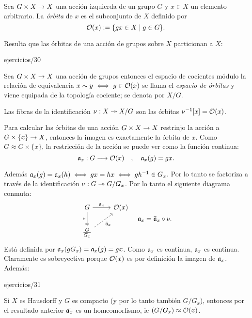 \documentclass[../../topologia_algebraica]{subfiles}
\begin{document}
\begin{defin}
  Sea $G\times X\rightarrow X$ una acci\'on izquierda de un grupo $G$ y $x\in X$ un elemento arbitrario.
  La \emph{\'orbita} de $x$ es el subconjunto de $X$ definido por
  \[
    \mathcal{O}(x):=\{gx\in X\mid g\in G\}.
  \]
\end{defin}

Resulta que las \'orbitas de una acci\'on de grupos sobre $X$ particionan a $X$:

{ejercicios/30} %

\begin{defin}
  Sea $G\times X\rightarrow X$ una acci\'on de grupos entonces el espacio de cocientes m\'odulo la
  relaci\'on de equivalencia $x\sim y\iff y\in\mathcal{O}(x)$ se llama el \emph{espacio de \'orbitas}
  y viene equipada de la topolog\'ia cociente; se denota por $X/G$.
\end{defin}

\begin{nota}
  Las fibras de la identificaci\'on $\nu:X \twoheadrightarrow X/G$ son las \'orbitas $\nu^{-1}[x]=\mathcal{O}(x)$. 
\end{nota}

Para calcular las \'orbitas de una acci\'on $G\times X\rightarrow X$ restrinjo la acci\'on a
$G\times\{x\}\rightarrow X$, entonces la imagen es exactamente la \'orbita de $x$. Como
$G\approx G\times\{x\}$,  la restricci\'on de la acci\'on se puede ver como la funci\'on continua:
\[
  \mathfrak{a}_x:G \longrightarrow \mathcal{O}(x) \quad ,\quad \mathfrak{a}_x(g)=gx.
\]

Adem\'as $\mathfrak{a}_x(g)=\mathfrak{a}_x(h)\iff gx=hx \iff gh^{-1}\in G_x$. Por lo tanto se factoriza a trav\'es de
la identificaci\'on $\nu:G\twoheadrightarrow G/G_x$. Por lo tanto el siguiente diagrama conmuta:
\[
  \begin{tikzcd}
    G \arrow[d,two heads,"\nu"'] \arrow[r,"\a_x"] & \Oo(x) \\
    \tfrac{G}{G_x} \arrow[ur,dashed,"\bar{\a}_x"']
  \end{tikzcd} \quad
  \a_x=\bar{\a}_x\circ\nu.
\]
Est\'a definida por $\mathfrak{a}_x(gG_x)=\mathfrak{a}_x(g)=gx$. Como $\mathfrak{a}_x$ es continua, $\bar{\mathfrak{a}}_x$ es continua.
Claramente es sobreyectiva porque $\mathcal{O}(x)$ es por definici\'on la imagen de $\mathfrak{a}_x$. Adem\'as:

{ejercicios/31}%

\begin{nota}
  Si $X$ es Hausdorff y $G$ es compacto (y por lo tanto tambi\'en $G/G_x$), entonces por el
  resultado anterior $\bar{\mathfrak{a}_x}$ es un homeomorfismo, ie $(G/G_x)\approx\mathcal{O}(x)$.
\end{nota}
\end{document}

